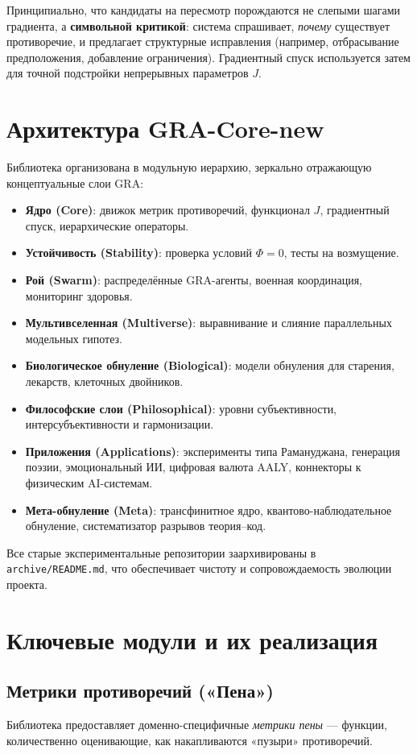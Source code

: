\documentclass[11pt,a4paper]{article}
\begin{document}
Принципиально, что кандидаты на пересмотр порождаются не слепыми шагами градиента, а \textbf{символьной критикой}: система спрашивает, \emph{почему} существует противоречие, и предлагает структурные исправления (например, отбрасывание предположения, добавление ограничения). Градиентный спуск используется затем для точной подстройки непрерывных параметров $J$.

\section{Архитектура GRA-Core-new}
Библиотека организована в модульную иерархию, зеркально отражающую концептуальные слои GRA:

\begin{itemize}[nosep]
    \item \textbf{Ядро (Core)}: движок метрик противоречий, функционал $J$, градиентный спуск, иерархические операторы.
    \item \textbf{Устойчивость (Stability)}: проверка условий $\Phi=0$, тесты на возмущение.
    \item \textbf{Рой (Swarm)}: распределённые GRA-агенты, военная координация, мониторинг здоровья.
    \item \textbf{Мультивселенная (Multiverse)}: выравнивание и слияние параллельных модельных гипотез.
    \item \textbf{Биологическое обнуление (Biological)}: модели обнуления для старения, лекарств, клеточных двойников.
    \item \textbf{Философские слои (Philosophical)}: уровни субъективности, интерсубъективности и гармонизации.
    \item \textbf{Приложения (Applications)}: эксперименты типа Рамануджана, генерация поэзии, эмоциональный ИИ, цифровая валюта AALY, коннекторы к физическим AI-системам.
    \item \textbf{Мета-обнуление (Meta)}: трансфинитное ядро, квантово-наблюдательное обнуление, систематизатор разрывов теория–код.
\end{itemize}

Все старые экспериментальные репозитории заархивированы в \texttt{archive/README.md}, что обеспечивает чистоту и сопровождаемость эволюции проекта.

\section{Ключевые модули и их реализация}
\subsection{Метрики противоречий («Пена»)}
Библиотека предоставляет доменно-специфичные \textit{метрики пены} — функции, количественно оценивающие, как накапливаются «пузыри» противоречий.
\end{document}
